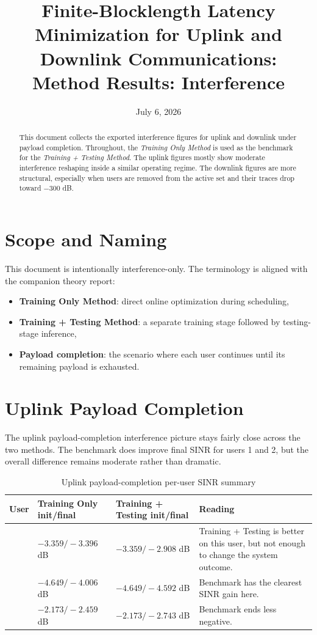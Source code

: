 \documentclass[11pt]{article}
\title{Finite-Blocklength Latency Minimization for Uplink and Downlink Communications:\\Method Results: Interference}
\author{}
\date{July 6, 2026}
\begin{document}
\maketitle

\begin{abstract}
This document collects the exported interference figures for uplink and
downlink under payload completion. Throughout, the \emph{Training Only Method}
is used as the benchmark for the \emph{Training + Testing Method}. The uplink
figures mostly show moderate interference reshaping inside a similar operating
regime. The downlink figures are more structural, especially when users are
removed from the active set and their traces drop toward \(-300\) dB.
\end{abstract}

\section{Scope and Naming}

This document is intentionally interference-only. The terminology is aligned
with the companion theory report:
\begin{itemize}[leftmargin=1.5em]
    \item \textbf{Training Only Method}: direct online optimization during scheduling,
    \item \textbf{Training + Testing Method}: a separate training stage followed by testing-stage inference,
    \item \textbf{Payload completion}: the scenario where each user continues until its remaining payload is exhausted.
\end{itemize}

\section{Uplink Payload Completion}

The uplink payload-completion interference picture stays fairly close across the
two methods. The benchmark does improve final SINR for users 1 and 2, but the
overall difference remains moderate rather than dramatic.

\begin{table}[H]
\centering
\small
\caption{Uplink payload-completion per-user SINR summary}
\renewcommand{\arraystretch}{1.15}
\begin{tabularx}{\textwidth}{>{\centering\arraybackslash}p{} >{\centering\arraybackslash}p{} >{\centering\arraybackslash}p{} X}
\toprule
User & Training Only init/final & Training + Testing init/final & Reading \\
\midrule
0 & \(-3.359/-3.396\) dB & \(-3.359/-2.908\) dB & Training + Testing is better on this user, but not enough to change the system outcome. \\
1 & \(-4.649/-4.006\) dB & \(-4.649/-4.592\) dB & Benchmark has the clearest SINR gain here. \\
2 & \(-2.173/-2.459\) dB & \(-2.173/-2.743\) dB & Benchmark ends less negative. \\
\bottomrule
\end{tabularx}
\end{table}
\end{document}
